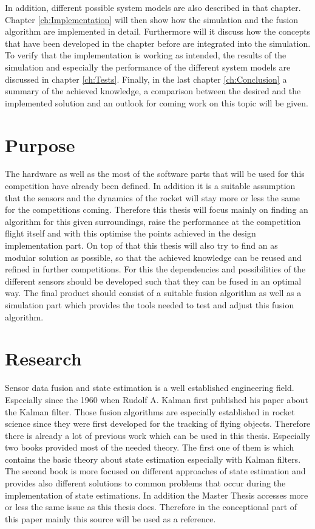  In addition, different possible system models are also described in that chapter.
 Chapter \ref{ch:Implementation} will then show how the simulation and the fusion algorithm are implemented in detail.
 Furthermore will it discuss how the concepts that have been developed in the chapter before are integrated into the simulation.
 To verify that the implementation is working as intended, the results of the simulation and especially the performance of the different system models are discussed in chapter \ref{ch:Tests}.
 Finally, in the last chapter \ref{ch:Conclusion} a summary of the achieved knowledge, a comparison between the desired and the implemented solution and an outlook for coming work on this topic will be given.
 \newpage


 \section{Purpose}
 The hardware as well as the most of the software parts that will be used for this competition have already been defined.
 In addition it is a suitable assumption that the sensors and the dynamics of the rocket will stay more or less the same for the competitions coming.
 Therefore this thesis will focus mainly on finding an algorithm for this given surroundings, raise the performance at the competition flight itself and with this optimise the points achieved in the design implementation part.
 On top of that this thesis will also try to find an as modular solution as possible, so that the achieved knowledge can be reused and refined in further competitions.
 For this the dependencies and possibilities of the different sensors should be developed such that they can be fused in an optimal way.
 The final product should consist of a suitable fusion algorithm as well as a simulation part which provides the tools needed to test and adjust this fusion algorithm.

 \section{Research}
 Sensor data fusion and state estimation is a well established engineering field.
 Especially since the 1960 when Rudolf A. Kalman first published his paper about the Kalman filter.
 Those fusion algorithms are especially established in rocket science since they were first developed for the tracking of flying objects.
 Therefore there is already a lot of previous work which can be used in this thesis.
 Especially two books provided most of the needed theory. The first one of them is
 \cite{DavidWSchultz2004} which contains the basic theory about state estimation especially with Kalman filters. The second book
 \cite{SimonDan2006Ose:} is more focused on different approaches of state estimation and
 provides also different solutions to common problems that occur during the implementation of state estimations.
 In addition the Master Thesis \cite{BryanTongMinh2012} accesses more or less the same issue as this thesis does.
 Therefore in the conceptional part of this paper mainly this source will be used as a reference.

